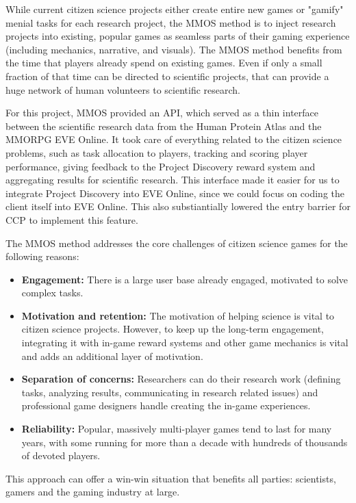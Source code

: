 	While current citizen science projects either create entire new games or "gamify" menial tasks for each research project, the MMOS method is to inject research projects into existing, popular games as seamless parts of their gaming experience (including mechanics, narrative, and visuals). The MMOS method benefits from the time that players already spend on existing games. Even if only a small fraction of that time can be directed to scientific projects, that can provide a huge network of human volunteers to scientific research.

	For this project, MMOS provided an API, which served as a thin interface between the scientific research data from the Human Protein Atlas and the MMORPG EVE Online. It took care of everything related to the citizen science problems, such as task allocation to players, tracking and scoring player performance, giving feedback to the Project Discovery reward system and aggregating results for scientific research. This interface made it easier for us to integrate Project Discovery into EVE Online, since we could focus on coding the client itself into EVE Online. This also substiantially lowered the entry barrier for CCP to implement this feature.

	The MMOS method addresses the core challenges of citizen science games for the following reasons:

	\begin{itemize}
	  \item {\bf Engagement:} There is a large user base already engaged, motivated to solve complex tasks.
	  \item {\bf Motivation and retention:} The motivation of helping science is vital to citizen science projects. However, to keep up the long-term engagement, integrating it with in-game reward systems and other game mechanics is vital and adds an additional layer of motivation.
	  \item {\bf Separation of concerns:} Researchers can do their research work (defining tasks, analyzing results, communicating in research related issues) and professional game designers handle creating the in-game experiences.
	  \item {\bf Reliability:} Popular, massively multi-player games tend to last for many years, with some running for more than a decade with hundreds of thousands of devoted players.
	\end{itemize}

	This approach can offer a win-win situation that benefits all parties: scientists, gamers and the gaming industry at large.

